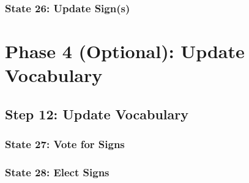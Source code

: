 \subsubsection{State 26: Update Sign(s)}

\section{Phase 4 (Optional): Update Vocabulary}

\subsection{Step 12: Update Vocabulary}

\subsubsection{State 27: Vote for Signs}

\subsubsection{State 28: Elect Signs}